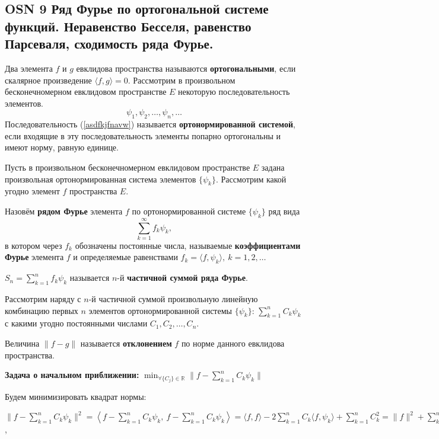 \subsection*{OSN 9 Ряд Фурье по ортогональной системе функций. Неравенство Бесселя, равенство Парсеваля,  сходимость ряда Фурье.}

Два элемента $f$ и $g$ евклидова пространства называются \textbf{ортогональными}, если скалярное произведение $\langle f, g \rangle = 0$.
Рассмотрим в произвольном бесконечномерном евклидовом пространстве $E$ некоторую последовательность элементов.
\begin{equation}
    \psi_1, \psi_2, \dots, \psi_n, \dots
    \label{asdfkjfnavw}
\end{equation}
Последовательность (\ref{asdfkjfnavw}) называется \textbf{ортонормированной системой}, если входящие в эту последовательность элементы попарно ортогональны и имеют норму, равную единице.

Пусть в произвольном бесконечномерном евклидовом пространстве $E$ задана произвольная ортонормированная система элементов $\{\psi_k\}$. Рассмотрим какой угодно элемент $f$ пространства $E$.

Назовём \textbf{рядом Фурье} элемента $f$ по ортонормированной системе $\{\psi_k\}$ ряд вида
$$\displaystyle\sum_{k=1}^{\infty} f_k\psi_k,$$
в котором через $f_k$ обозначены постоянные числа, называемые \textbf{коэффициентами Фурье} элемента $f$ и определяемые равенствами $f_k =\langle f,\psi_k\rangle, ~ k=1,2,\dots$

$S_n =\displaystyle\sum_{k=1}^{n}f_k\psi_k$ называется $n$-й \textbf{частичной суммой ряда Фурье}.

Рассмотрим наряду с $n$-й частичной суммой произвольную линейную комбинацию первых $n$ элементов ортонормированной системы $\{\psi_k\}$: $\displaystyle\sum_{k=1}^{n}C_k\psi_k$ с какими угодно постоянными числами $C_1, C_2, \dots, C_n$.

Величина $ \| f-g \|$ называется \textbf{отклонением} $f$ по норме данного евклидова пространства.

\textbf{Задача о начальном приближении:} $\displaystyle\min_{\forall\{C_j\}\in\mathbb{R}}  \|f-\displaystyle\sum_{k=1}^{n}C_k\psi_k \|$

Будем минимизировать квадрат нормы:

$ \| f-\displaystyle\sum_{k=1}^{n}C_k\psi_k \|^2 =  
\left\langle f-\displaystyle\sum_{k=1}^{n}C_k\psi_k, ~ f-\displaystyle\sum_{k=1}^{n}C_k\psi_k \right\rangle = 
\langle f, f \rangle - 2\displaystyle\sum_{k=1}^{n}C_k\langle f, \psi_k \rangle + \displaystyle\sum_{k=1}^{n} C_k^2 = 
\| f\|^2 + \displaystyle\sum_{k=1}^{n}(C_k^2-2C_kf_k) = 
\left\{ \pm \displaystyle\sum_{k=1}^{n}f_k^2 \right\} = 
\| f\|^2 - \displaystyle\sum_{k=1}^{n}f_k^2 + \displaystyle\sum_{k=1}^{n}(C_k-f_k)^2$,


